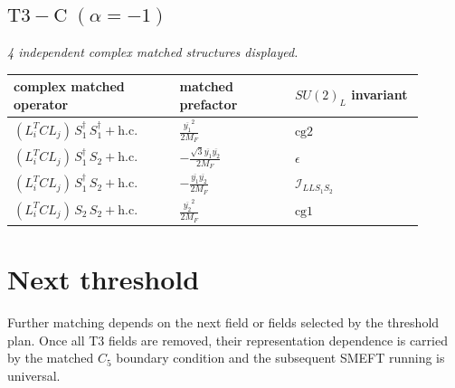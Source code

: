 \documentclass[9pt]{article}
\begin{document}
\subsection*{$ \mathrm{T3-C}\;(\alpha=-1) $}
\textit{4 independent complex matched structures displayed. }
\begin{longtable}{@{}p{0.36\linewidth}p{0.25\linewidth}p{0.29\linewidth}@{}}
\toprule
complex matched operator & matched prefactor & $SU(2)_L$ invariant \\
\midrule
$ (L_i^T C L_j)\,S_1^\dagger\,S_1^\dagger+\mathrm{h.c.} $ & $ \frac{\overline{y_{1}}^{2}}{2 M_F} $ & $ \mathrm{cg2} $ \\
$ (L_i^T C L_j)\,S_1^\dagger\,S_2+\mathrm{h.c.} $ & $ - \frac{\sqrt{3} \overline{y_{1}} \overline{y_{2}}}{2 M_F} $ & $ \epsilon $ \\
$ (L_i^T C L_j)\,S_1^\dagger\,S_2+\mathrm{h.c.} $ & $ - \frac{\overline{y_{1}} \overline{y_{2}}}{2 M_F} $ & $ \mathcal{I}_{LLS_1S_2} $ \\
$ (L_i^T C L_j)\,S_2\,S_2+\mathrm{h.c.} $ & $ \frac{\overline{y_{2}}^{2}}{2 M_F} $ & $ \mathrm{cg1} $ \\
\bottomrule
\end{longtable}
\section*{Next threshold}
Further matching depends on the next field or fields selected by the threshold plan.  Once all T3 fields are removed, their representation dependence is carried by the matched $C_5$ boundary condition and the subsequent SMEFT running is universal.
\end{document}
